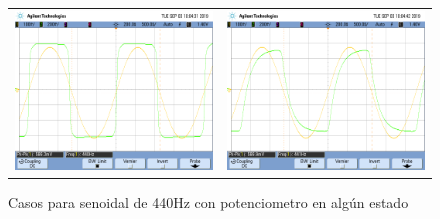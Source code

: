 \begin{figure}[H]
\begin{tabular}{c c}
        \includegraphics[scale=0.2]{../EJ5/Mediciones/Osciloscopio/Senoide_440_Medio/scope_7.png} &
        \includegraphics[scale=0.2]{../EJ5/Mediciones/Osciloscopio/Senoide_440_Medio/scope_8.png} 
    \end{tabular}
    \caption{Casos para senoidal de 440Hz con potenciometro en alg\'un estado}
    \label{fig:senoide_440_medio}
\end{figure}

